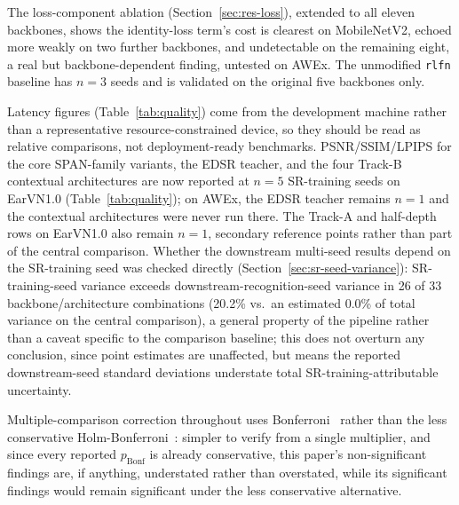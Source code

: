 \documentclass[pdflatex,sn-vancouver-num]{sn-jnl}
\begin{document}
The loss-component ablation (Section~\ref{sec:res-loss}), extended to all eleven backbones, shows the identity-loss term's cost is clearest on MobileNetV2, echoed more weakly on two further backbones, and undetectable on the remaining eight, a real but backbone-dependent finding, untested on AWEx. The unmodified \texttt{rlfn} baseline has $n=3$ seeds and is validated on the original five backbones only.

Latency figures (Table~\ref{tab:quality}) come from the development machine rather than a representative resource-constrained device, so they should be read as relative comparisons, not deployment-ready benchmarks. PSNR/SSIM/LPIPS for the core SPAN-family variants, the EDSR teacher, and the four Track-B contextual architectures are now reported at $n=5$ SR-training seeds on EarVN1.0 (Table~\ref{tab:quality}); on AWEx, the EDSR teacher remains $n=1$ and the contextual architectures were never run there. The Track-A and half-depth rows on EarVN1.0 also remain $n=1$, secondary reference points rather than part of the central comparison. Whether the downstream multi-seed results depend on the SR-training seed was checked directly (Section~\ref{sec:sr-seed-variance}): SR-training-seed variance exceeds downstream-recognition-seed variance in 26 of 33 backbone/architecture combinations (20.2\% vs.\ an estimated 0.0\% of total variance on the central comparison), a general property of the pipeline rather than a caveat specific to the comparison baseline; this does not overturn any conclusion, since point estimates are unaffected, but means the reported downstream-seed standard deviations understate total SR-training-attributable uncertainty.

Multiple-comparison correction throughout uses Bonferroni~\cite{dunn1961multiple} rather than the less conservative Holm-Bonferroni~\cite{holm1979sequential}: simpler to verify from a single multiplier, and since every reported $p_{\text{Bonf}}$ is already conservative, this paper's non-significant findings are, if anything, understated rather than overstated, while its significant findings would remain significant under the less conservative alternative.
\end{document}
